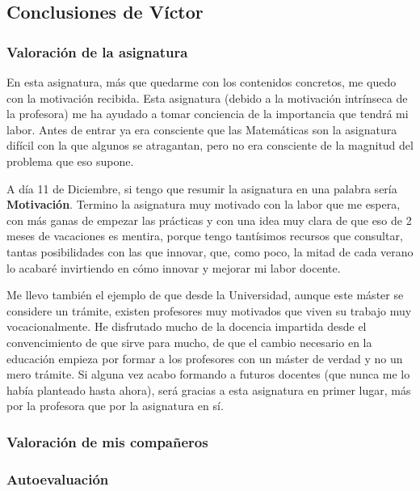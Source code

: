 \subsection{Conclusiones de Víctor}
\begin{leftbar}{\victorcolor}

\subsubsection{Valoración de la asignatura}

En esta asignatura, más que quedarme con los contenidos concretos, me quedo con la motivación recibida.
%
Esta asignatura (debido a la motivación intrínseca de la profesora) me ha ayudado a tomar conciencia de la importancia que tendrá mi labor. 
%
Antes de entrar ya era consciente que las Matemáticas son la asignatura difícil con la que algunos se atragantan, pero no era consciente de la magnitud del problema que eso supone.

A día 11 de Diciembre, si tengo que resumir la asignatura en una palabra sería \textbf{Motivación}. 
%
Termino la asignatura muy motivado con la labor que me espera, con más ganas de empezar las prácticas y con una idea muy clara de que eso de 2 meses de vacaciones es mentira, porque tengo tantísimos recursos que consultar, tantas posibilidades con las que innovar, que, como poco, la mitad de cada verano lo acabaré invirtiendo en cómo innovar y mejorar mi labor docente.

Me llevo también el ejemplo de que desde la Universidad, aunque este máster se considere un trámite, existen profesores muy motivados que viven su trabajo muy vocacionalmente. 
%
He disfrutado mucho de la docencia impartida desde el convencimiento de que sirve para mucho, de que el cambio necesario en la educación empieza por formar a los profesores con un máster de verdad y no un mero trámite. Si alguna vez acabo formando a futuros docentes (que nunca me lo había planteado hasta ahora), será gracias a esta asignatura en primer lugar, más por la profesora que por la asignatura en sí. 

\subsubsection{Valoración de mis compañeros}

\subsubsection{Autoevaluación}



\end{leftbar}

